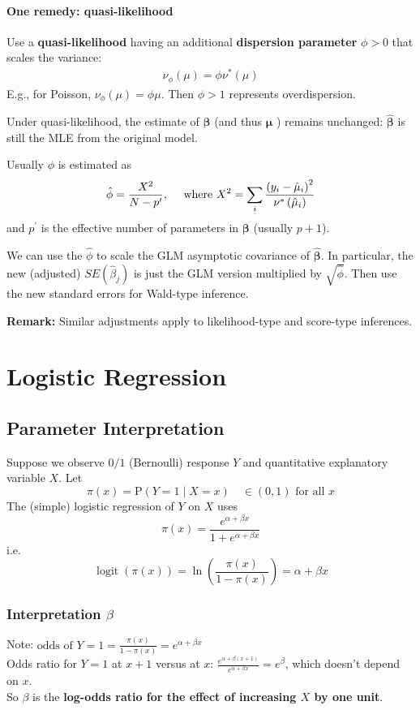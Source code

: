 \documentclass[11pt]{elegantbook}
\begin{document}
\subsubsection*{One remedy: quasi-likelihood}
Use a \textbf{quasi-likelihood} having an additional \textbf{dispersion parameter} $\phi>0$ that scales the variance:
\begin{equation}
    \begin{aligned}
        \nu_\phi(\mu)=\phi\nu^*(\mu)
    \end{aligned}
    \nonumber
\end{equation}
E.g., for Poisson, $\nu_\phi(\mu)=\phi\mu$. Then $\phi > 1$ represents overdispersion.

Under quasi-likelihood, the estimate of $\boldsymbol{\beta}$ (and thus $\boldsymbol{\mu}$ ) remains unchanged: $\hat{\boldsymbol{\beta}}$ is still the MLE from the original model.

Usually $\phi$ is estimated as
$$
\hat{\phi}=\frac{X^2}{N-p^{\prime}},\quad\textnormal{ where }
X^2=\sum_i \frac{\left(y_i-\hat{\mu}_i\right)^2}{\nu^*\left(\hat{\mu}_i\right)}
$$
and $p^{\prime}$ is the effective number of parameters in $\boldsymbol{\beta}$ (usually $p+1$).

We can use the $\hat{\phi}$ to scale the GLM asymptotic covariance of $\hat{\boldsymbol{\beta}}$. In particular, the new (adjusted) $S E\left(\hat{\beta}_j\right)$ is just the GLM version multiplied by $\sqrt{\hat{\phi}}$. Then use the new standard errors for Wald-type inference.

\textbf{Remark:} Similar adjustments apply to likelihood-type and score-type inferences.

\chapter{Logistic Regression}
\section{Parameter Interpretation}
Suppose we observe $0 / 1$ (Bernoulli) response $Y$ and quantitative explanatory variable $X$.
Let
$$
\pi(x)=\mathrm{P}(Y=1 \mid X=x) \quad \in(0,1) \text { for all } x
$$
The (simple) logistic regression of $Y$ on $X$ uses
$$
\pi(x)=\frac{e^{\alpha+\beta x}}{1+e^{\alpha+\beta x}}
$$
i.e.
$$
\operatorname{logit}(\pi(x))=\ln \left(\frac{\pi(x)}{1-\pi(x)}\right)=\alpha+\beta x
$$
\subsection{Interpretation $\beta$}
Note: $\text {odds of } Y=1=\frac{\pi(x)}{1-\pi(x)}=e^{\alpha+\beta x}$\\
Odds ratio for $Y=1$ at $x+1$ versus at $x$: $\frac{e^{\alpha+\beta(x+1)}}{e^{\alpha+\beta x}}=e^\beta$, which doesn't depend on $x$.\\
So $\beta$ is the \textbf{log-odds ratio for the effect of increasing $X$ by one unit}.
\end{document}

